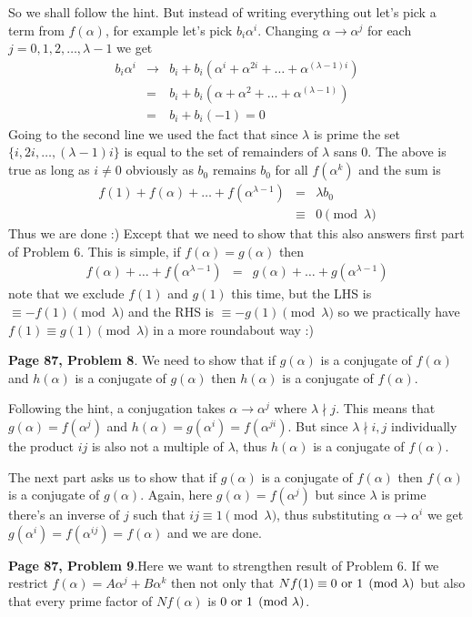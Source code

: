 \documentclass[aps,preprint,preprintnumbers,nofootinbib,showpacs,prd]{revtex4-1}
\newcommand{\nbea}{\begin{eqnarray*}}
\newcommand{\neea}{\end{eqnarray*}}
\begin{document}
So we shall follow the hint. But instead of writing everything out let's pick a term from $f(\alpha)$, for example let's pick $b_i\alpha^i$. Changing $\alpha \to \alpha^j$ for each $j = 0,1,2,\dots,\lambda-1$ we get
%
\nbea
b_i\alpha^i & \to & b_i + b_i(\alpha^{i} + \alpha^{2i} + \dots + \alpha^{(\lambda - 1)i}) \\
& = & b_i + b_i(\alpha + \alpha^{2} + \dots + \alpha^{(\lambda - 1)}) \\
& = & b_i + b_i(-1) = 0
\neea
%
Going to the second line we used the fact that since $\lambda$ is prime the set $\{i, 2i, \dots, (\lambda-1)i\}$ is equal to the set of remainders of $\lambda$ sans 0. The above is true as long as $i \neq 0$ obviously as $b_0$ remains $b_0$ for all $f(\alpha^k)$ and the sum is
%
\nbea
f(1) + f(\alpha) + \dots + f(\alpha^{\lambda-1}) & = & \lambda b_0 \\
& \equiv & 0 \pmod{\lambda}
\neea
%
Thus we are done :) Except that we need to show that this also answers first part of Problem 6. This is simple, if $f(\alpha) = g(\alpha)$ then 
%
\nbea
f(\alpha) + \dots + f(\alpha^{\lambda-1}) & = & g(\alpha) + \dots + g(\alpha^{\lambda-1})
\neea
%
note that we exclude $f(1)$ and $g(1)$ this time, but the LHS is $\equiv -f(1) \pmod{\lambda}$ and the RHS is $\equiv -g(1)\pmod{\lambda}$ so we practically have $f(1) \equiv g(1) \pmod{\lambda}$ in a more roundabout way :)

{\bf Page 87, Problem 8}. We need to show that if $g(\alpha)$ is a conjugate of $f(\alpha)$ and $h(\alpha)$ is a conjugate of $g(\alpha)$ then $h(\alpha)$ is a conjugate of $f(\alpha)$.

Following the hint, a conjugation takes $\alpha\to\alpha^j$ where $\lambda\nmid j$. This means that $g(\alpha) = f(\alpha^j)$ and $h(\alpha) = g(\alpha^i) = f(\alpha^{ji})$. But since $\lambda\nmid i,j$ individually the product $ij$ is also not a multiple of $\lambda$, thus $h(\alpha)$ is a conjugate of $f(\alpha)$.

The next part asks us to show that if $g(\alpha)$ is a conjugate of $f(\alpha)$ then $f(\alpha)$ is a conjugate of $g(\alpha)$. Again, here $g(\alpha) = f(\alpha^j)$ but since $\lambda$ is prime there's an inverse of $j$ such that $ij \equiv 1 \pmod{\lambda}$, thus substituting $\alpha\to\alpha^i$ we get $g(\alpha^i) = f(\alpha^{ij}) = f(\alpha)$ and we are done.

{\bf Page 87, Problem 9}.Here we want to strengthen result of Problem 6. If we restrict $f(\alpha) = A\alpha^j + B\alpha^k$ then not only that $Nf(1) \equiv 0 {\rm ~or~} 1 \pmod{\lambda}$ but also that every prime factor of $Nf(\alpha)$ is $0 {\rm~or~} 1 \pmod{\lambda}$.
\end{document}
